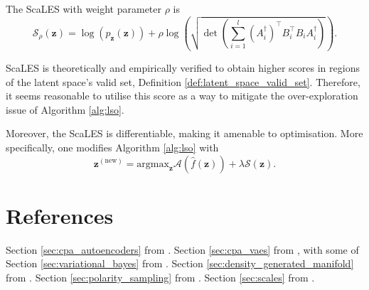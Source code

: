 \begin{definition}
    The ScaLES with weight parameter $\rho$ is $$\mathcal{S}_{\rho}(\mathbf{z})=\log\left(p_{\mathbf{z}}(\mathbf{z})\right)+\rho\log\left(\sqrt{\det\left(\sum_{i=1}^l\left(A_i^{\dagger}\right)^\top B_i^\top B_iA_i^{\dagger}\right)}\right).$$
\end{definition}

ScaLES is theoretically and empirically verified to obtain higher scores in regions of the latent space's valid set, Definition \ref{def:latent_space_valid_set}. Therefore, it seems reasonable to utilise this score as a way to mitigate the over-exploration issue of Algorithm \ref{alg:lso}.

Moreover, the ScaLES is differentiable, making it amenable to optimisation. More specifically, one modifies Algorithm \ref{alg:lso} with $$\mathbf{z}^{(\text{new})}=\mathrm{argmax}_{\mathbf{z}}\mathcal{A}\left(\hat{f}(\mathbf{z})\right)+\lambda\mathcal{S}(\mathbf{z}).$$

\section{References}

Section \ref{sec:cpa_autoencoders} from \citet{cosentinoDeepAutoencodersUnderstanding2022}. Section \ref{sec:cpa_vaes} from \citet{balestrieroAnalyticalProbabilityDistributions2020}, with some of Section \ref{sec:variational_bayes} from \citet{kingmaAutoEncodingVariationalBayes2022}. Section \ref{sec:density_generated_manifold} from \cite{humayunMaGNETUniformSampling2022}. Section \ref{sec:polarity_sampling} from \cite{humayunPolaritySamplingQuality2022}. Section \ref{sec:scales} from \citet{ronenScaLESScalableLatent2024}.